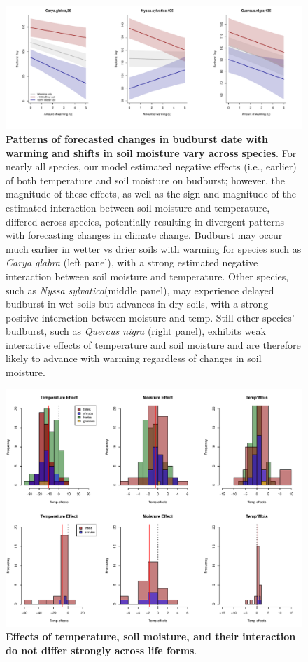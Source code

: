 \documentclass{article}
\begin{document}
 
 \begin{figure}[h]
\centering
 \includegraphics{../../Analyses/soilmoisture/figures/tempforecast_bb_0_5_28_105_135_NA_4_degwarm.pdf}
 \caption{\textbf{Patterns of forecasted changes in budburst date with warming and shifts in soil moisture vary across species}. For nearly all species, our model estimated negative effects (i.e., earlier) of both temperature and soil moisture on budburst; however, the magnitude of these effects, as well as the sign and magnitude of the estimated interaction between soil moisture and temperature, differed across species, potentially resulting in divergent patterns with forecasting changes in climate change.  Budburst may occur much earlier in wetter vs drier soils with warming for species such as \textit{Carya glabra} (left panel), with a strong estimated negative interaction between soil moisture and temperature. Other species, such as \textit{Nyssa sylvatica}(middle panel), may experience delayed budburst in wet soils but advances in dry soils, with a strong positive interaction between moisture and temp. Still other species' budburst, such as \textit{Quercus nigra} (right panel), exhibits weak interactive effects of temperature and soil moisture and are therefore likely to advance with warming regardless of changes in soil moisture.}
 \label{fig:bbsp}
 \end{figure}
 
  
 \begin{figure}[h]
\centering
 \includegraphics{../../Analyses/soilmoisture/figures/histbbloform_spef.pdf}
 \caption{\textbf{Effects of temperature, soil moisture, and their interaction do not differ strongly across life forms}.}
 \label{fig:forms}
 \end{figure}
 
\end{document}
